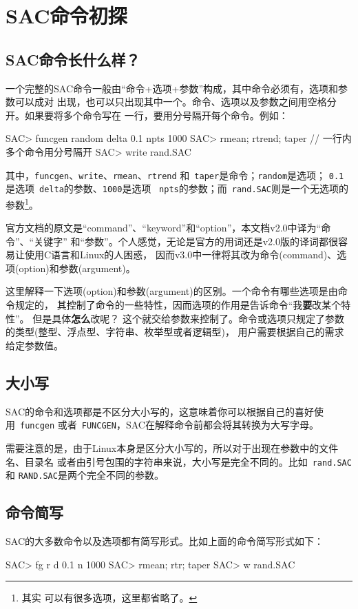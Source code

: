 \section{SAC命令初探}
\subsection{SAC命令长什么样？}
一个完整的SAC命令一般由``命令+选项+参数''构成，其中命令必须有，选项和参数可以成对
出现，也可以只出现其中一个。命令、选项以及参数之间用空格分开。如果要将多个命令写在
一行，要用分号隔开每个命令。例如：
\begin{SACCode}
SAC> funcgen random delta 0.1 npts 1000
SAC> rmean; rtrend; taper                 // 一行内多个命令用分号隔开
SAC> write rand.SAC
\end{SACCode}
其中，\verb+funcgen+、\verb+write+、\verb+rmean+、\verb+rtrend+
和~\verb+taper+是命令；\verb+random+是选项；
\verb+0.1+是选项~\verb+delta+的参数、\verb+1000+是选项
~\verb+npts+的参数；而~\verb+rand.SAC+则是一个无选项的参数\footnote{其实
可以有很多选项，这里都省略了。}。

\begin{note}
官方文档的原文是“command”、“keyword”和“option”，本文档v2.0中译为“命令”、“关键字”
和“参数”。个人感觉，无论是官方的用词还是v2.0版的译词都很容易让使用C语言和Linux的人困惑，
因而v3.0中一律将其改为命令(command)、选项(option)和参数(argument)。

这里解释一下选项(option)和参数(argument)的区别。一个命令有哪些选项是由命令规定的，
其控制了命令的一些特性，因而选项的作用是告诉命令“我\textbf{要}改某个特性”。
但是具体\textbf{怎么}改呢？
这个就交给参数来控制了。命令或选项只规定了参数的类型(整型、浮点型、字符串、枚举型或者逻辑型)，
用户需要根据自己的需求给定参数值。
\end{note}

\subsection{大小写}
SAC的命令和选项都是不区分大小写的，这意味着你可以根据自己的喜好使用~\verb+funcgen+
或者~\verb+FUNCGEN+，SAC在解释命令前都会将其转换为大写字母。

需要注意的是，由于Linux本身是区分大小写的，所以对于出现在参数中的文件名、目录名
或者由引号包围的字符串来说，大小写是完全不同的。比如~\verb+rand.SAC+和
\verb+RAND.SAC+是两个完全不同的参数。

\subsection{命令简写}
SAC的大多数命令以及选项都有简写形式。比如上面的命令简写形式如下：
\begin{SACCode}
SAC> fg r d 0.1 n 1000
SAC> rmean; rtr; taper
SAC> w rand.SAC
\end{SACCode}

